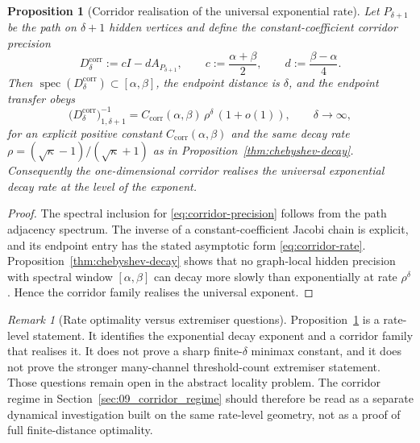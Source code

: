 \documentclass[11pt]{article}
\numberwithin{equation}{section}
\theoremstyle{thmcompact}
\newtheorem{proposition}[theorem]{Proposition}
\theoremstyle{remark}
\newtheorem*{remarkplain}{Remark}
\newenvironment{remark}[1][]%
{\begin{remarkbox}\begin{remarkplain}[#1]\normalfont}
		{\end{remarkplain}\end{remarkbox}}
\begin{document}
\begin{proposition}[Corridor realisation of the universal exponential rate]\label{thm:corridor}
Let $P_{\delta+1}$ be the path on $\delta+1$ hidden vertices and define the constant-coefficient corridor precision
\begin{equation}\label{eq:corridor-precision}
D_\delta^{\mathrm{corr}} := cI-dA_{P_{\delta+1}},
\qquad
c:=\frac{\alpha+\beta}{2},
\qquad
d:=\frac{\beta-\alpha}{4}.
\end{equation}
Then $\operatorname{spec}(D_\delta^{\mathrm{corr}})\subset[\alpha,\beta]$, the endpoint distance is $\delta$, and the endpoint transfer obeys
\begin{equation}\label{eq:corridor-rate}
\bigl(D_\delta^{\mathrm{corr}}\bigr)^{-1}_{1,\delta+1}
=
C_{\mathrm{corr}}(\alpha,\beta)\,\rho^\delta\,(1+o(1)),
\qquad \delta\to\infty,
\end{equation}
for an explicit positive constant $C_{\mathrm{corr}}(\alpha,\beta)$ and the same decay rate $\rho=(\sqrt\kappa-1)/(\sqrt\kappa+1)$ as in Proposition~\ref{thm:chebyshev-decay}. Consequently the one-dimensional corridor realises the universal exponential decay rate at the level of the exponent.
\end{proposition}

\begin{proof}
The spectral inclusion for \eqref{eq:corridor-precision} follows from the path adjacency spectrum. The inverse of a constant-coefficient Jacobi chain is explicit, and its endpoint entry has the stated asymptotic form \eqref{eq:corridor-rate}. Proposition~\ref{thm:chebyshev-decay} shows that no graph-local hidden precision with spectral window $[\alpha,\beta]$ can decay more slowly than exponentially at rate $\rho^\delta$. Hence the corridor family realises the universal exponent.
\end{proof}

\begin{remark}[Rate optimality versus extremiser questions]
Proposition~\ref{thm:corridor} is a rate-level statement. It identifies the exponential decay exponent and a corridor family that realises it. It does not prove a sharp finite-$\delta$ minimax constant, and it does not prove the stronger many-channel threshold-count extremiser statement. Those questions remain open in the abstract locality problem. The corridor regime in Section~\ref{sec:09_corridor_regime} should therefore be read as a separate dynamical investigation built on the same rate-level geometry, not as a proof of full finite-distance optimality.
\end{remark}
\end{document}
